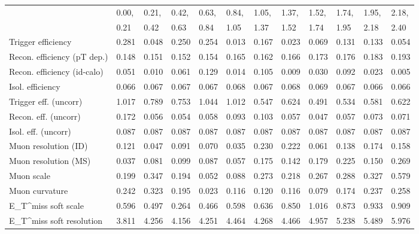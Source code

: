 \begin{tabular}{l|p{0.6cm}p{0.6cm}p{0.6cm}p{0.6cm}p{0.6cm}p{0.6cm}p{0.6cm}p{0.6cm}p{0.6cm}p{0.6cm}p{0.6cm}}
\hline
   & 0.00, & 0.21, & 0.42, & 0.63, & 0.84, & 1.05, & 1.37, & 1.52, & 1.74, & 1.95, & 2.18,  \\ 
   & 0.21 & 0.42 & 0.63 & 0.84 & 1.05 & 1.37 & 1.52 & 1.74 & 1.95 & 2.18 & 2.40  \\ 
\hline
Trigger efficiency                       & 0.281 & 0.048 & 0.250 & 0.254 & 0.013 & 0.167 & 0.023 & 0.069 & 0.131 & 0.133 & 0.054 \\
Recon. efficiency (pT dep.)              & 0.148 & 0.151 & 0.152 & 0.154 & 0.165 & 0.162 & 0.166 & 0.173 & 0.176 & 0.183 & 0.193 \\
Recon. efficiency (id-calo)              & 0.051 & 0.010 & 0.061 & 0.129 & 0.014 & 0.105 & 0.009 & 0.030 & 0.092 & 0.023 & 0.005 \\
Isol. efficiency                         & 0.066 & 0.067 & 0.067 & 0.067 & 0.068 & 0.067 & 0.068 & 0.069 & 0.067 & 0.066 & 0.066 \\
Trigger eff. (uncorr)                    & 1.017 & 0.789 & 0.753 & 1.044 & 1.012 & 0.547 & 0.624 & 0.491 & 0.534 & 0.581 & 0.622 \\
Recon. eff. (uncorr)                     & 0.172 & 0.056 & 0.054 & 0.058 & 0.093 & 0.103 & 0.057 & 0.047 & 0.057 & 0.073 & 0.071 \\
Isol. eff. (uncorr)                      & 0.087 & 0.087 & 0.087 & 0.087 & 0.087 & 0.087 & 0.087 & 0.087 & 0.087 & 0.087 & 0.087 \\
Muon resolution (ID)                     & 0.121 & 0.047 & 0.091 & 0.070 & 0.035 & 0.230 & 0.222 & 0.061 & 0.138 & 0.174 & 0.158 \\
Muon resolution (MS)                     & 0.037 & 0.081 & 0.099 & 0.087 & 0.057 & 0.175 & 0.142 & 0.179 & 0.225 & 0.150 & 0.269 \\
Muon scale                               & 0.199 & 0.347 & 0.194 & 0.052 & 0.088 & 0.273 & 0.218 & 0.267 & 0.288 & 0.327 & 0.579 \\
Muon curvature                           & 0.242 & 0.323 & 0.195 & 0.023 & 0.116 & 0.120 & 0.116 & 0.079 & 0.174 & 0.237 & 0.258 \\
E_{T}^{miss} soft scale                  & 0.596 & 0.497 & 0.264 & 0.466 & 0.598 & 0.636 & 0.850 & 1.016 & 0.873 & 0.933 & 0.909 \\
E_{T}^{miss} soft resolution             & 3.811 & 4.256 & 4.156 & 4.251 & 4.464 & 4.268 & 4.466 & 4.957 & 5.238 & 5.489 & 5.976 \\

\end{tabular}
